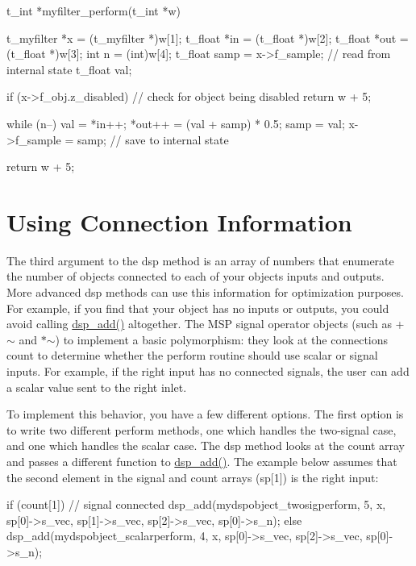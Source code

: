 \begin{DoxyCode}
    t_int *myfilter_perform(t_int *w)
    {
        t_myfilter *x = (t_myfilter *)w[1];
        t_float *in = (t_float *)w[2];
        t_float *out = (t_float *)w[3];
        int n = (int)w[4];
        t_float samp = x->f_sample; // read from internal state
        t_float val;

        if (x->f_obj.z_disabled)    // check for object being disabled
            return w + 5;
 
        while (n--) {
            val = *in++;
            *out++ = (val + samp) * 0.5;
            samp = val;
        }
        x->f_sample = samp;     // save to internal state

        return w + 5;
    }
\end{DoxyCode}
\hypertarget{chapter_msp_advanced_chapter_msp_advanced_connections}{}\section{Using Connection Information}\label{chapter_msp_advanced_chapter_msp_advanced_connections}
The third argument to the dsp method is an array of numbers that enumerate the number of objects connected to each of your objects inputs and outputs. More advanced dsp methods can use this information for optimization purposes. For example, if you find that your object has no inputs or outputs, you could avoid calling \hyperlink{group__msp_gae9a75fa230b1db6d8316405d4a6065cc}{dsp\_\-add()} altogether. The MSP signal operator objects (such as +$\sim$ and $\ast$$\sim$) to implement a basic polymorphism: they look at the connections count to determine whether the perform routine should use scalar or signal inputs. For example, if the right input has no connected signals, the user can add a scalar value sent to the right inlet.

To implement this behavior, you have a few different options. The first option is to write two different perform methods, one which handles the two-\/signal case, and one which handles the scalar case. The dsp method looks at the count array and passes a different function to \hyperlink{group__msp_gae9a75fa230b1db6d8316405d4a6065cc}{dsp\_\-add()}. The example below assumes that the second element in the signal and count arrays (sp\mbox{[}1\mbox{]}) is the right input:


\begin{DoxyCode}
        if (count[1])   // signal connected
            dsp_add(mydspobject_twosigperform, 5, x, sp[0]->s_vec, sp[1]->s_vec, 
      sp[2]->s_vec, sp[0]->s_n);
        else
            dsp_add(mydspobject_scalarperform, 4, x, sp[0]->s_vec, sp[2]->s_vec, 
      sp[0]->s_n);
\end{DoxyCode}


